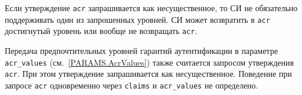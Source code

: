 Если утверждение \lstinline{acr} запрашивается как несущественное,
то СИ не обязательно поддерживать один из запрошенных уровней.
СИ может возвратить в \lstinline{acr} достигнутый уровень 
или вообще не возвращать \lstinline{acr}.

Передача предпочтительных уровней гарантий аутентификации в параметре 
\lstinline{acr_values} (см.~\ref{PARAMS.AcrValues}) также считается 
запросом утверждения \lstinline{acr}. При этом утверждение запрашивается
как несущественное. Поведение при запросе \lstinline{acr} одновременно через 
\lstinline{claims} и \lstinline{acr_values} не определено.
	